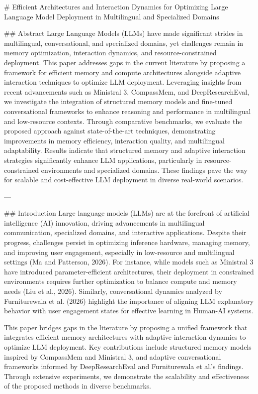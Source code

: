# Efficient Architectures and Interaction Dynamics for Optimizing Large Language Model Deployment in Multilingual and Specialized Domains

## Abstract
Large Language Models (LLMs) have made significant strides in multilingual, conversational, and specialized domains, yet challenges remain in memory optimization, interaction dynamics, and resource-constrained deployment. This paper addresses gaps in the current literature by proposing a framework for efficient memory and compute architectures alongside adaptive interaction techniques to optimize LLM deployment. Leveraging insights from recent advancements such as Ministral 3, CompassMem, and DeepResearchEval, we investigate the integration of structured memory models and fine-tuned conversational frameworks to enhance reasoning and performance in multilingual and low-resource contexts. Through comparative benchmarks, we evaluate the proposed approach against state-of-the-art techniques, demonstrating improvements in memory efficiency, interaction quality, and multilingual adaptability. Results indicate that structured memory and adaptive interaction strategies significantly enhance LLM applications, particularly in resource-constrained environments and specialized domains. These findings pave the way for scalable and cost-effective LLM deployment in diverse real-world scenarios.

---

## Introduction
Large language models (LLMs) are at the forefront of artificial intelligence (AI) innovation, driving advancements in multilingual communication, specialized domains, and interactive applications. Despite their progress, challenges persist in optimizing inference hardware, managing memory, and improving user engagement, especially in low-resource and multilingual settings (Ma and Patterson, 2026). For instance, while models such as Ministral 3 have introduced parameter-efficient architectures, their deployment in constrained environments requires further optimization to balance compute and memory needs (Liu et al., 2026). Similarly, conversational dynamics analyzed by Furniturewala et al. (2026) highlight the importance of aligning LLM explanatory behavior with user engagement states for effective learning in Human-AI systems.

This paper bridges gaps in the literature by proposing a unified framework that integrates efficient memory architectures with adaptive interaction dynamics to optimize LLM deployment. Key contributions include structured memory models inspired by CompassMem and Ministral 3, and adaptive conversational frameworks informed by DeepResearchEval and Furniturewala et al.'s findings. Through extensive experiments, we demonstrate the scalability and effectiveness of the proposed methods in diverse benchmarks.


